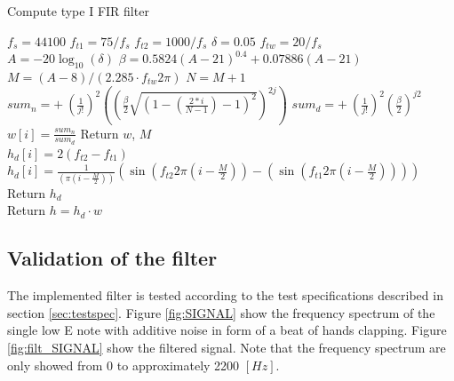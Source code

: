 \begin{algorithm}[H]
\caption{Compute type I FIR filter}
\label{alg:FIR}
\begin{algorithmic}[1] 
\State $f_s= 44100$ 
\State $f_{t1} = 75/f_s$ 
\State $f_{t2} = 1000/f_s$ 
\State $\delta = 0.05$  
\State $f_{tw} =20/ f_s$  
\\
\State $A=-20\log_{10}(\delta)$ 
\State $\beta = 0.5824(A-21)^{0.4} + 0.07886(A-21)$ 
\State $M = (A-8)/(2.285 \cdot f_{tw}  2\pi)$ 
\State $N = M+1$ 
			\State $ sum_n = + \ (\frac{1}{j!})^2 \left( \left( \frac{\beta}{2} \sqrt{\left(1 - \left( \frac{2*i}{N-1}\right) - 1\right)^2}\right)^{2j}\right)$
			\State $ sum_d = + \ (\frac{1}{j!})^2 \left( \frac{\beta}{2}\right)^{j2}$
		\EndFor
		\State $w[i]=\frac{sum_n}{sum_d}$
	\EndFor
	\State Return $w$, $M$
\EndProcedure
\\
        		\State $h_d[i] = 2(f_{t2} - f_{t1})$
        	\Else 
        		\State  $h_d[i] = \frac{1}{ (\pi (i - \frac{M}{2}))}(\sin(f_{t2} 2 \pi (i - \frac{M}{2})) - (\sin(f_{t1} 2 \pi (i - \frac{M}{2}))))$ 
        	\EndIf 
	\EndFor
	\State Return $h_d$
\EndProcedure
\\
	\State Return $h = h_d \cdot w$ 
\EndProcedure


\end{algorithmic}
\end{algorithm}

\subsection{Validation of the filter}
The implemented filter is tested according to the test specifications described in section \ref{sec:testspec}. Figure \ref{fig:SIGNAL} show the frequency spectrum of the single low E note with additive noise in form of a beat of hands clapping. Figure \ref{fig:filt_SIGNAL} show the filtered signal. Note that the frequency spectrum are only showed from 0 to approximately 2200 $[Hz]$.  

